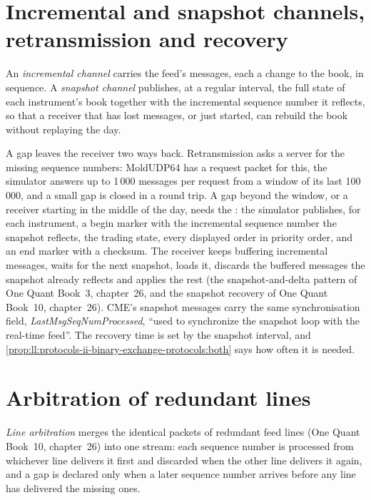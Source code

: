 \section{Incremental and snapshot channels, retransmission and recovery}

\begin{definition}\label{def:ll:protocols-ii-binary-exchange-protocols:channels}
An \emph{incremental channel} carries the feed's messages, each a change to the book, in sequence.
A \emph{snapshot channel} publishes, at a regular interval, the full state of each instrument's book
together with the incremental sequence number it reflects, so that a receiver that has lost messages, or just started, can
rebuild the book without replaying the day.
\end{definition}

A gap leaves the receiver two ways back. Retransmission asks a server for the missing sequence numbers: MoldUDP64 has a
request packet for this, the simulator answers up to 1\,000 messages per request from a window of its last 100\,000, and a
small gap is closed in a round trip. A gap beyond the window, or a receiver starting in the middle of the day, needs the
: the simulator publishes, for each instrument, a begin marker with the incremental sequence number the
snapshot reflects, the trading state, every displayed order in priority order, and an end marker with a checksum. The
receiver keeps buffering incremental messages, waits for the next snapshot, loads it, discards the buffered messages the
snapshot already reflects and applies the rest (the snapshot-and-delta pattern of One Quant Book~3, chapter~26, and the
snapshot recovery of One Quant Book~10, chapter~26). CME's snapshot messages carry the same synchronisation field,
\emph{LastMsgSeqNumProcessed}, ``used to synchronize the snapshot loop with the real-time feed''. The recovery time is set
by the snapshot interval, and \cref{prop:ll:protocols-ii-binary-exchange-protocols:both} says how often it is needed.

\section{Arbitration of redundant lines}

\begin{definition}\label{def:ll:protocols-ii-binary-exchange-protocols:arbitration}
\emph{Line arbitration} merges the identical packets of redundant feed lines (One Quant Book~10,
chapter~26) into one stream: each sequence number is processed from whichever line delivers it first and discarded when the
other line delivers it again, and a gap is declared only when a later sequence number arrives before any line has delivered
the missing ones.
\end{definition}

